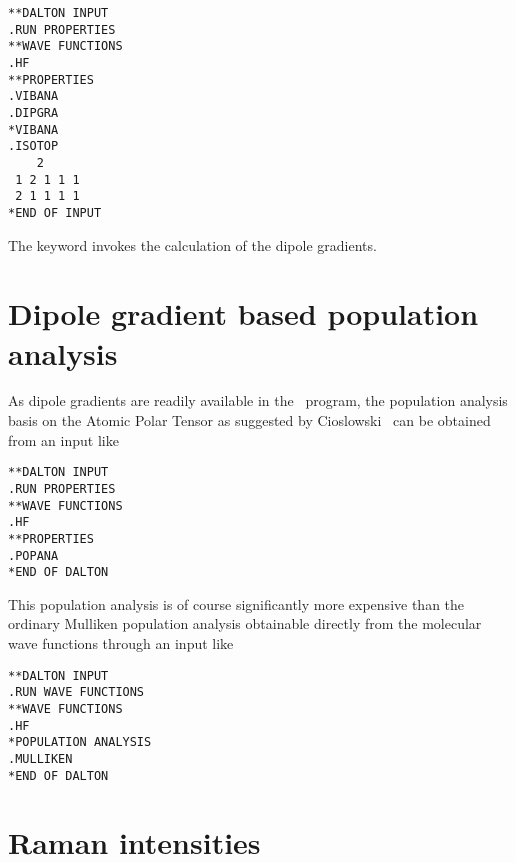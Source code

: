 \begin{verbatim}
**DALTON INPUT
.RUN PROPERTIES
**WAVE FUNCTIONS
.HF
**PROPERTIES
.VIBANA
.DIPGRA
*VIBANA
.ISOTOP
    2
 1 2 1 1 1
 2 1 1 1 1
*END OF INPUT
\end{verbatim}

The keyword  invokes the calculation of the dipole
gradients.

\section{Dipole gradient based population analysis}

\begin{center}
\end{center}

 As dipole gradients are readily available in the
\siraba\ program, the
population analysis basis on the Atomic Polar Tensor as suggested by
Cioslowski~\cite{jcjacs111} can be obtained from an input like

\begin{verbatim}
**DALTON INPUT
.RUN PROPERTIES
**WAVE FUNCTIONS
.HF
**PROPERTIES
.POPANA
*END OF DALTON
\end{verbatim}

This population analysis is of course significantly more expensive
than the ordinary Mulliken population analysis obtainable directly
from the molecular wave functions through an input like

\begin{verbatim}
**DALTON INPUT
.RUN WAVE FUNCTIONS
**WAVE FUNCTIONS
.HF
*POPULATION ANALYSIS
.MULLIKEN
*END OF DALTON
\end{verbatim}


\section{Raman intensities}\label{sec:ramanint}

